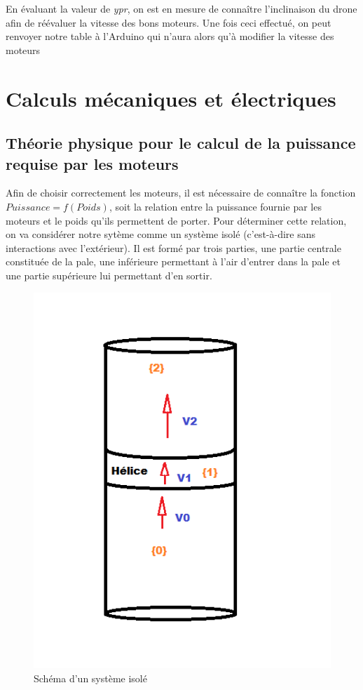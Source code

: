 \documentclass[a4paper,10pt]{report}
\begin{document}
	  En évaluant la valeur de \textit{ypr}, on est en mesure de connaître 
l'inclinaison du drone afin de réévaluer la vitesse des bons moteurs. Une fois 
ceci effectué, on peut renvoyer notre table à l'Arduino qui n'aura alors qu'à 
modifier la vitesse des moteurs
    
    \chapter{Calculs mécaniques et électriques}
      \section{Théorie physique pour le calcul de la puissance requise par les 
moteurs}
	Afin de choisir correctement les moteurs, il est nécessaire de 
connaître la fonction $Puissance = f(Poids)$, soit la relation entre la 
puissance fournie par les moteurs et le poids qu'ils permettent de porter. Pour 
déterminer cette relation, on va considérer notre sytème comme un système 
isolé (c'est-à-dire sans interactions avec l'extérieur). Il est formé par 
trois parties, une partie centrale constituée de la pale, une inférieure 
permettant à l'air d'entrer dans la pale et une partie supérieure lui 
permettant d'en sortir. 

	  \begin{figure}[htbp]
	    \centering
	    \includegraphics[scale = 0.5]{img/systeme_isole.png}
	    \caption{Schéma d'un système isolé}
	    \label{systemisole}
	  \end{figure}
	  
\end{document}
